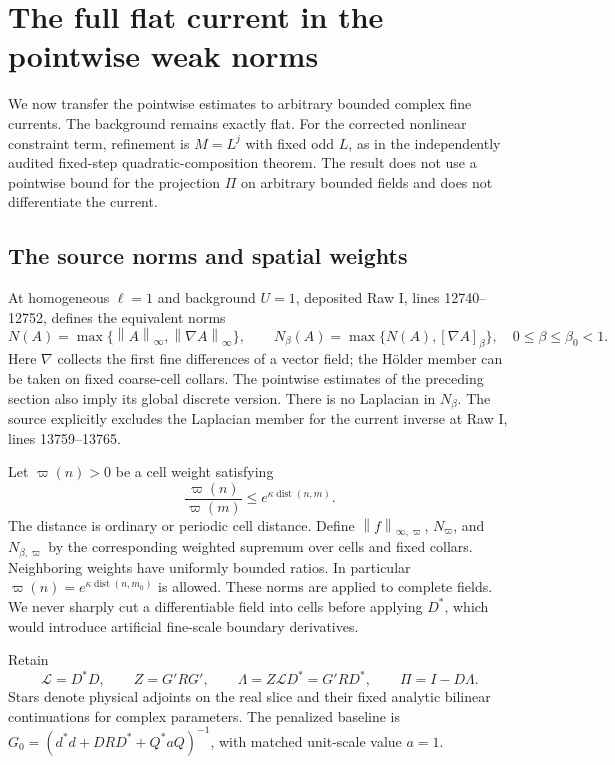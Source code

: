 \documentclass[11pt]{article}
\theoremstyle{remark}
\newcommand{\norm}[1]{\left\|#1\right\|}
\begin{document}
\section{The full flat current in the pointwise weak norms}
\label{pc-section}

We now transfer the pointwise estimates to arbitrary bounded complex
fine currents. The background remains exactly flat. For the corrected
nonlinear constraint term, refinement is $M=L^j$ with fixed odd $L$,
as in the independently audited fixed-step quadratic-composition
theorem. The result does not use a pointwise bound for the projection
$\Pi$ on arbitrary bounded fields and does not differentiate the current.

\subsection{The source norms and spatial weights}

At homogeneous $\ell=1$ and background $U=1$, deposited Raw I,
lines 12740--12752, defines the equivalent norms
\begin{equation}\label{pc-source-norms}
 N(A)=\max\{\norm{A}_\infty,\norm{\nabla A}_\infty\},\qquad
 N_\beta(A)=\max\{N(A),[\nabla A]_\beta\},
 \quad 0\le\beta\le\beta_0<1.
\end{equation}
Here $\nabla$ collects the first fine differences of a vector field;
the H\"older member can be taken on fixed coarse-cell collars.
The pointwise estimates of the preceding section also imply its
global discrete version. There is no Laplacian in $N_\beta$.
The source explicitly excludes the Laplacian member for the current
inverse at Raw I, lines 13759--13765.

Let $\varpi(n)>0$ be a cell weight satisfying
\begin{equation}\label{pc-weight-ratio}
 \frac{\varpi(n)}{\varpi(m)}
       \le e^{\kappa\operatorname{dist}(n,m)}.
\end{equation}
The distance is ordinary or periodic cell distance. Define
$\norm{f}_{\infty,\varpi}$, $N_\varpi$, and $N_{\beta,\varpi}$
by the corresponding weighted supremum over cells and fixed collars.
Neighboring weights have uniformly bounded ratios. In particular
$\varpi(n)=e^{\kappa\operatorname{dist}(n,m_0)}$ is allowed.
These norms are applied to complete fields. We never sharply cut a
differentiable field into cells before applying $D^*$, which would
introduce artificial fine-scale boundary derivatives.

Retain
\begin{equation}\label{pc-scalar-data}
 \mathcal L=D^*D,\qquad Z=G'RG',\qquad
 \Lambda=Z\mathcal L D^*=G'RD^*,\qquad \Pi=I-D\Lambda.
\end{equation}
Stars denote physical adjoints on the real slice and their fixed
analytic bilinear continuations for complex parameters. The
penalized baseline is
$G_0=(d^*d+DRD^*+Q^*aQ)^{-1}$, with matched unit-scale value $a=1$.
\end{document}

